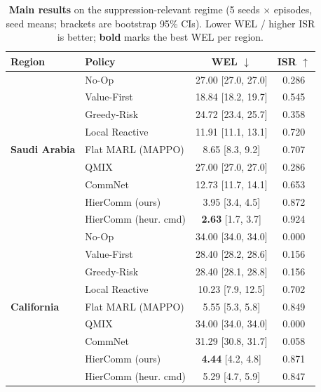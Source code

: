 \begin{table}[t]
\centering
\caption{\textbf{Main results} on the suppression-relevant regime (5 seeds $\times$ episodes, seed means; brackets are bootstrap 95\% CIs). Lower WEL / higher ISR is better; \textbf{bold} marks the best WEL per region.}
\label{tab:main_results}
\begin{tabular}{llcc}
\toprule
Region & Policy & WEL $\downarrow$ & ISR $\uparrow$ \\
\midrule
\multirow{9}{*}{\textbf{Saudi Arabia}}
& No-Op & 27.00 \small{[27.0, 27.0]} & 0.286 \\
& Value-First & 18.84 \small{[18.2, 19.7]} & 0.545 \\
& Greedy-Risk & 24.72 \small{[23.4, 25.7]} & 0.358 \\
& Local Reactive & 11.91 \small{[11.1, 13.1]} & 0.720 \\
& Flat MARL (MAPPO) & 8.65 \small{[8.3, 9.2]} & 0.707 \\
& QMIX & 27.00 \small{[27.0, 27.0]} & 0.286 \\
& CommNet & 12.73 \small{[11.7, 14.1]} & 0.653 \\
& HierComm (ours) & 3.95 \small{[3.4, 4.5]} & 0.872 \\
& HierComm (heur. cmd) & \textbf{2.63} \small{[1.7, 3.7]} & 0.924 \\
\midrule
\multirow{9}{*}{\textbf{California}}
& No-Op & 34.00 \small{[34.0, 34.0]} & 0.000 \\
& Value-First & 28.40 \small{[28.2, 28.6]} & 0.156 \\
& Greedy-Risk & 28.40 \small{[28.1, 28.8]} & 0.156 \\
& Local Reactive & 10.23 \small{[7.9, 12.5]} & 0.702 \\
& Flat MARL (MAPPO) & 5.55 \small{[5.3, 5.8]} & 0.849 \\
& QMIX & 34.00 \small{[34.0, 34.0]} & 0.000 \\
& CommNet & 31.29 \small{[30.8, 31.7]} & 0.058 \\
& HierComm (ours) & \textbf{4.44} \small{[4.2, 4.8]} & 0.871 \\
& HierComm (heur. cmd) & 5.29 \small{[4.7, 5.9]} & 0.847 \\
\bottomrule
\end{tabular}
\end{table}
